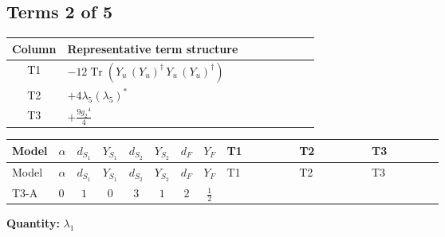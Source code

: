 \documentclass[8pt]{article}
\begin{document}
\begin{landscape}
\subsection*{Terms 2 of 5}
\begin{center}
\begin{tabular}{@{}c >{\raggedright\arraybackslash}p{0.82\linewidth}@{}}
\toprule
Column & Representative term structure \\
\midrule
T1 & \(\displaystyle -12 \operatorname{Tr}\!\left({Y_u}\,\left({Y_u}\right)^{\dagger}\,{Y_u}\,\left({Y_u}\right)^{\dagger}\right)\) \\
\midrule
T2 & \(\displaystyle +4 {\lambda_5} \left({\lambda_5}\right)^{*}\) \\
\midrule
T3 & \(\displaystyle +\frac{9 {g_2}^4}{4}\) \\
\midrule
\bottomrule
\end{tabular}
\end{center}
\smallskip
\tiny
\begin{longtable}{@{}llcccccc >{\raggedright\arraybackslash}p{0.21\linewidth} >{\raggedright\arraybackslash}p{0.21\linewidth} >{\raggedright\arraybackslash}p{0.21\linewidth}@{}}
\toprule
Model & $\alpha$ & $d_{S_1}$ & $Y_{S_1}$ & $d_{S_2}$ & $Y_{S_2}$ & $d_F$ & $Y_F$ & T1 & T2 & T3 \\
\midrule
\endfirsthead
\toprule
Model & $\alpha$ & $d_{S_1}$ & $Y_{S_1}$ & $d_{S_2}$ & $Y_{S_2}$ & $d_F$ & $Y_F$ & T1 & T2 & T3 \\
\midrule
\endhead
T3-A & $0$ & $1$ & $0$ & $3$ & $1$ & $2$ & $\frac{1}{2}$ & \scriptsize\adjustbox{max width=\linewidth}{$\begin{gathered} -12 \operatorname{Tr}\!\left({Y_u}\,\left({Y_u}\right)^{\dagger}\,{Y_u}\,\left({Y_u}\right)^{\dagger}\right)\end{gathered}$} & \scriptsize\adjustbox{max width=\linewidth}{$\begin{gathered} +4 {\lambda_5} \left({\lambda_5}\right)^{*}\end{gathered}$} & \scriptsize\adjustbox{max width=\linewidth}{$\begin{gathered} +\frac{9 {g_2}^4}{4}\end{gathered}$} \\
\midrule
\bottomrule
\end{longtable}
\clearpage
\noindent\textbf{Quantity: }$\lambda_1$\par\smallskip

\end{landscape}
\end{document}
